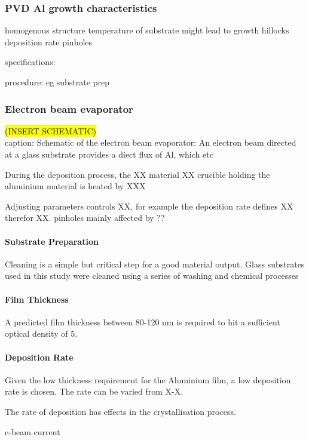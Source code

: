 \documentclass{article}
\begin{document}
\subsubsection{PVD Al growth characteristics}

homogenous structure 
temperature of substrate might lead to growth hillocks
deposition rate 
pinholes
 



specifications:

procedure: eg substrate prep




\subsubsection{Electron beam evaporator}




\hl{(INSERT SCHEMATIC)} \\
caption: Schematic of the electron beam evaporator: An electron beam directed at a glass
substrate provides a diect flux of Al, which etc

During the deposition process, the XX material XX crucible holding
the aluminium material is heated by XXX

Adjusting parameters controls XX, for example the deposition rate defines XX therefor XX. 
pinholes mainly affected by ??
\paragraph{Substrate Preparation}
Cleaning is a simple but critical step for a good material
output. Glass substrates used in this study were cleaned using
a series of washing and chemical processes

\paragraph{Film Thickness}
A predicted film thickness between 80-120 nm is required
to hit a sufficient optical density of 5.

\paragraph{Deposition Rate}
Given the low thickness requirement for the Aluminium
film, a low deposition rate is chosen. The rate can be
varied from X-X. 

The rate of deposition has effects in the crystallisation
process. 

e-beam current
\end{document}
